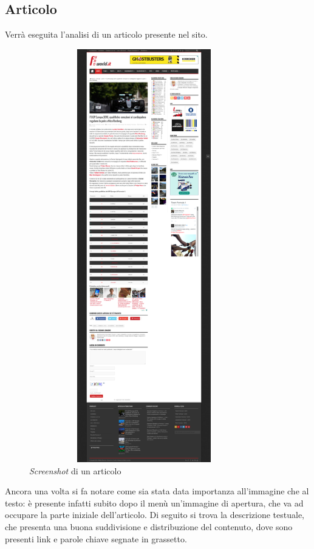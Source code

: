 \subsection{Articolo}
Verr\`a eseguita l'analisi di un articolo presente nel sito.

\begin{figure}[h] %
  \centering
  \includegraphics[height=18cm, width=10cm]{res/img/Article}
  \caption{\textit{Screenshot} di un articolo}
\end{figure}

Ancora una volta si fa notare come sia stata data importanza all'immagine che al
testo: è presente infatti subito dopo il menù un'immagine di apertura, che va
ad occupare la parte iniziale dell'articolo.
Di seguito si trova la descrizione testuale, che presenta una buona suddivisione
e distribuzione del contenuto, dove sono presenti link e parole chiave segnate
in grassetto.

